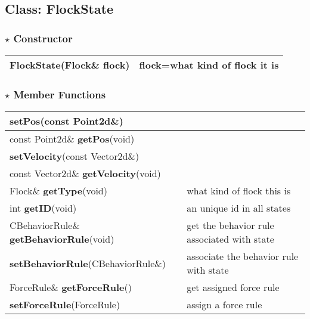\documentclass[onecolumn,10pt]{article}
\begin{document}
\subsection{Class: FlockState}
\subsubsection*{$\star$ Constructor}
\begin{tabular}{|l|l|}\hline
{\bf FlockState}(Flock\& flock) &  flock=what kind of flock it is \\\hline
\end{tabular}

\subsubsection*{$\star$ Member Functions}  

\begin{tabular}{|l|l|}\hline
{\bf setPos}(const Point2d\&)         & \\\hline
const  Point2d\& {\bf getPos}(void)         &\\\hline
{\bf setVelocity}(const Vector2d\&)    &\\\hline
const Vector2d\& {\bf getVelocity}(void)   &\\\hline
Flock\& {\bf  getType}(void)                &  what kind of flock this is\\\hline
int {\bf getID}(void)                      &  an unique id in all states\\\hline\hline
CBehaviorRule\& {\bf getBehaviorRule}(void)&  get the behavior rule associated with state\\\hline
{\bf setBehaviorRule}(CBehaviorRule\&)     &  associate the behavior rule with state\\\hline
ForceRule\& {\bf getForceRule}()           &  get assigned force rule\\\hline
{\bf setForceRule}(ForceRule)              &  assign a force rule\\\hline
\end{tabular}
\end{document}

